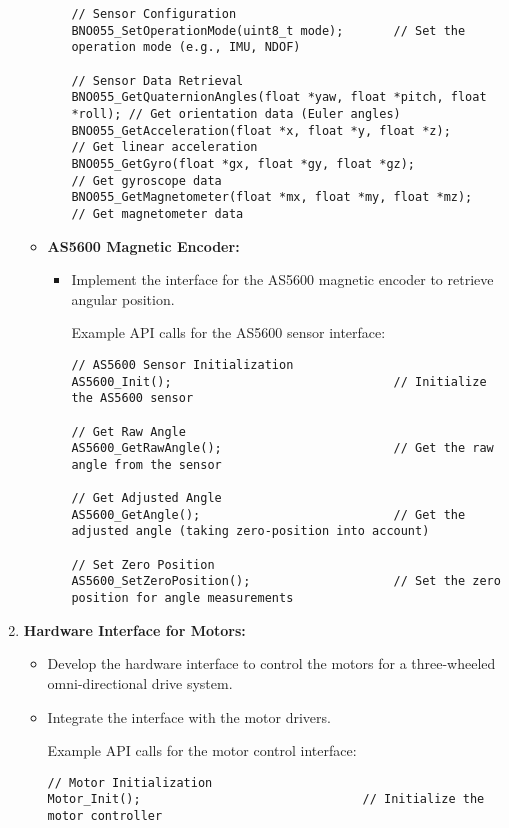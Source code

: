 \documentclass[a4paper,9pt]{article}
\begin{document}
\begin{enumerate}
\begin{itemize}
\begin{itemize}
\begin{lstlisting}
// Sensor Configuration
BNO055_SetOperationMode(uint8_t mode);       // Set the operation mode (e.g., IMU, NDOF)

// Sensor Data Retrieval
BNO055_GetQuaternionAngles(float *yaw, float *pitch, float *roll); // Get orientation data (Euler angles)
BNO055_GetAcceleration(float *x, float *y, float *z);         // Get linear acceleration
BNO055_GetGyro(float *gx, float *gy, float *gz);              // Get gyroscope data
BNO055_GetMagnetometer(float *mx, float *my, float *mz);      // Get magnetometer data
			                  \end{lstlisting}
		            \end{itemize}

		      \item \textbf{AS5600 Magnetic Encoder:}
		            \begin{itemize}
			            \item Implement the interface for the AS5600 magnetic encoder to retrieve angular position.

			                  Example API calls for the AS5600 sensor interface:
			                  \begin{lstlisting}
// AS5600 Sensor Initialization
AS5600_Init();                               // Initialize the AS5600 sensor

// Get Raw Angle
AS5600_GetRawAngle();                        // Get the raw angle from the sensor

// Get Adjusted Angle
AS5600_GetAngle();                           // Get the adjusted angle (taking zero-position into account)

// Set Zero Position
AS5600_SetZeroPosition();                    // Set the zero position for angle measurements
			                  \end{lstlisting}
		            \end{itemize}
	      \end{itemize}

	\item \textbf{Hardware Interface for Motors:}
	      \begin{itemize}
		      \item Develop the hardware interface to control the motors for a three-wheeled omni-directional drive system.
		      \item Integrate the interface with the motor drivers.

		            Example API calls for the motor control interface:
		            \begin{lstlisting}
// Motor Initialization
Motor_Init();                               // Initialize the motor controller


\end{lstlisting}
\end{itemize}
\end{enumerate}
\end{document}
